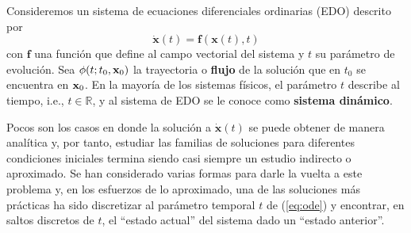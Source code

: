 Consideremos un sistema de ecuaciones diferenciales ordinarias (EDO) descrito por 
\begin{equation}
\dot{\mathbf{x}}(t) = \mathbf{f}(\mathbf{x}(t),t)
\label{eq:ode}
\end{equation}
con $\mathbf{f}$ una función que define al campo vectorial del sistema y $t$ su parámetro de evolución. Sea $\phi(t;t_0,\mathbf{x}_0)$ la trayectoria o \textbf{flujo} de la solución que en $t_0$ se encuentra en $\mathbf{x}_0$. En la mayoría de los sistemas físicos, el parámetro $t$ describe al tiempo, i.e., $t \in \mathbb{R}$, y al sistema de EDO se le conoce como \textbf{sistema dinámico}.

Pocos son los casos en donde la solución a $\dot{\mathbf{x}}(t)$ se puede obtener de manera analítica y, por tanto, estudiar las familias de soluciones para diferentes condiciones iniciales termina siendo casi siempre un estudio indirecto o aproximado. Se han considerado varias formas para darle la vuelta a este problema y, en los esfuerzos de lo aproximado, una de las soluciones más prácticas ha sido discretizar al parámetro temporal $t$ de (\ref{eq:ode}) y encontrar, en saltos discretos de $t$, el ``estado actual'' del sistema dado un ``estado anterior''.

